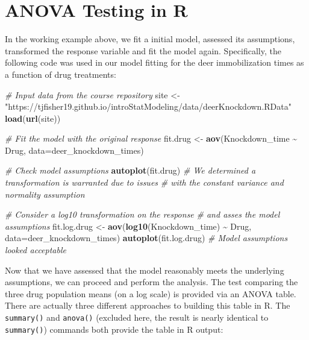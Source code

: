 \documentclass[
]{book}
\newenvironment{Shaded}{\begin{snugshade}}{\end{snugshade}}
\newcommand{\AttributeTok}[1]{\textcolor[rgb]{0.13,0.29,0.53}{#1}}
\newcommand{\CommentTok}[1]{\textcolor[rgb]{0.56,0.35,0.01}{\textit{#1}}}
\newcommand{\FunctionTok}[1]{\textcolor[rgb]{0.13,0.29,0.53}{\textbf{#1}}}
\newcommand{\NormalTok}[1]{#1}
\newcommand{\OtherTok}[1]{\textcolor[rgb]{0.56,0.35,0.01}{#1}}
\newcommand{\SpecialCharTok}[1]{\textcolor[rgb]{0.81,0.36,0.00}{\textbf{#1}}}
\newcommand{\StringTok}[1]{\textcolor[rgb]{0.31,0.60,0.02}{#1}}
\begin{document}
\hypertarget{anova-testing-in-r}{%
\section{ANOVA Testing in R}\label{anova-testing-in-r}}

In the working example above, we fit a initial model, assessed its assumptions, transformed the response variable and fit the model again. Specifically, the following code was used in our model fitting for the deer immobilization times as a function of drug treatments:

\begin{Shaded}
\begin{Highlighting}[]
\CommentTok{\# Input data from the course repository}
\NormalTok{site }\OtherTok{\textless{}{-}} \StringTok{"https://tjfisher19.github.io/introStatModeling/data/deerKnockdown.RData"}
\FunctionTok{load}\NormalTok{(}\FunctionTok{url}\NormalTok{(site))}

\CommentTok{\# Fit the model with the original response}
\NormalTok{fit.drug }\OtherTok{\textless{}{-}} \FunctionTok{aov}\NormalTok{(Knockdown\_time }\SpecialCharTok{\textasciitilde{}}\NormalTok{ Drug, }\AttributeTok{data=}\NormalTok{deer\_knockdown\_times)}

\CommentTok{\# Check model assumptions}
\FunctionTok{autoplot}\NormalTok{(fit.drug)}
\CommentTok{\# We determined a transformation is warranted due to issues}
\CommentTok{\#    with the constant variance and normality assumption}

\CommentTok{\# Consider a log10 transformation on the response}
\CommentTok{\#    and asses the model assumptions}
\NormalTok{fit.log.drug }\OtherTok{\textless{}{-}} \FunctionTok{aov}\NormalTok{(}\FunctionTok{log10}\NormalTok{(Knockdown\_time) }\SpecialCharTok{\textasciitilde{}}\NormalTok{ Drug, }\AttributeTok{data=}\NormalTok{deer\_knockdown\_times)}
\FunctionTok{autoplot}\NormalTok{(fit.log.drug)}
\CommentTok{\# Model assumptions looked acceptable}
\end{Highlighting}
\end{Shaded}

Now that we have assessed that the model reasonably meets the underlying assumptions, we can proceed and perform the analysis.
The test comparing the three drug population means (on a log scale) is provided via an ANOVA table.
There are actually three different approaches to building this table in R.
The \texttt{summary()} and \texttt{anova()} (excluded here, the result is nearly identical to \texttt{summary()}) commands both provide the table in R output:
\end{document}
